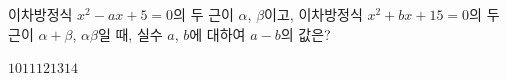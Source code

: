 이차방정식 $x^2-ax+5=0$의 두 근이 $\alpha$, $\beta$이고, 이차방정식 $x^2+bx+15=0$의 두 근이 $\alpha+\beta$, $\alpha\beta$일 때, 실수 $a$, $b$에 대하여 $a-b$의 값은?
\begin{choices32}{$10$}{$11$}{$12$}{$13$}{$14$}\end{choices32}
